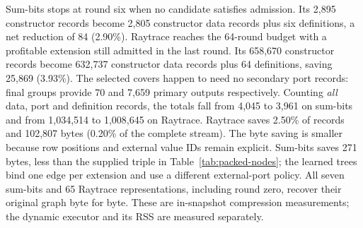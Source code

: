Sum-bits stops at round six when no candidate satisfies admission. Its 2,895 constructor records become 2,805 constructor data records plus six definitions, a net reduction of 84 (2.90\%). Raytrace reaches the 64-round budget with a profitable extension still admitted in the last round. Its 658,670 constructor records become 632,737 constructor data records plus 64 definitions, saving 25,869 (3.93\%). The selected covers happen to need no secondary port records: final groups provide 70 and 7,659 primary outputs respectively. Counting \emph{all} data, port and definition records, the totals fall from 4,045 to 3,961 on sum-bits and from 1,034,514 to 1,008,645 on Raytrace. Raytrace saves 2.50\% of records and 102,807 bytes (0.20\% of the complete stream). The byte saving is smaller because row positions and external value IDs remain explicit. Sum-bits saves 271 bytes, less than the supplied triple in Table~\ref{tab:packed-nodes}; the learned trees bind one edge per extension and use a different external-port policy. All seven sum-bits and 65 Raytrace representations, including round zero, recover their original graph byte for byte. These are in-snapshot compression measurements; the dynamic \run{} executor and its RSS are measured separately.
